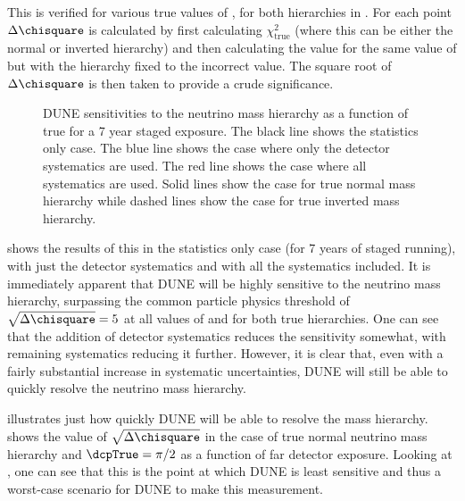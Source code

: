 This is verified for various true values of \dcp, for both hierarchies in .
For each \dcp point $\Delta \chisquare$ is calculated by first calculating $\chi^{2}_{\text{true}}$ (where this can be either the normal or inverted hierarchy) and then calculating the \chisquare value for the same value of \dcp but with the hierarchy fixed to the incorrect value.
The square root of $\Delta \chisquare$ is then taken to provide a crude significance.

\begin{figure}[h]
	\begin{adjustbox}{max totalsize=.6\linewidth, center}
		
	\end{adjustbox}
	\caption[DUNE sensitivity to the neutrino mass hierarchy as a function of true \dcp.]{DUNE sensitivities to the neutrino mass hierarchy as a function of true \dcp for a 7 year staged exposure. The black line shows the statistics only case. The blue line shows the case where only the detector systematics are used. The red line shows the case where all systematics are used. Solid lines show the case for true normal mass hierarchy while dashed lines show the case for true inverted mass hierarchy.}
	\label{fig:mhSens}
\end{figure}

 shows the results of this in the statistics only case (for 7 years of staged running), with just the detector systematics and with all the systematics included.
It is immediately apparent that DUNE will be highly sensitive to the neutrino mass hierarchy, surpassing the common particle physics threshold of $\sqrt{\Delta \chisquare} = 5$ at all values of \dcp and for both true hierarchies.
One can see that the addition of detector systematics reduces the sensitivity somewhat, with remaining systematics reducing it further.
However, it is clear that, even with a fairly substantial increase in systematic uncertainties, DUNE will still be able to quickly resolve the neutrino mass hierarchy.

 illustrates just how quickly DUNE will be able to resolve the mass hierarchy.
 shows the value of $\sqrt{\Delta\chisquare}$ in the case of true normal neutrino mass hierarchy and $\dcpTrue = \pi/2$ as a function of far detector exposure. 
Looking at , one can see that this is the point at which DUNE is least sensitive and thus a worst-case scenario for DUNE to make this measurement.

